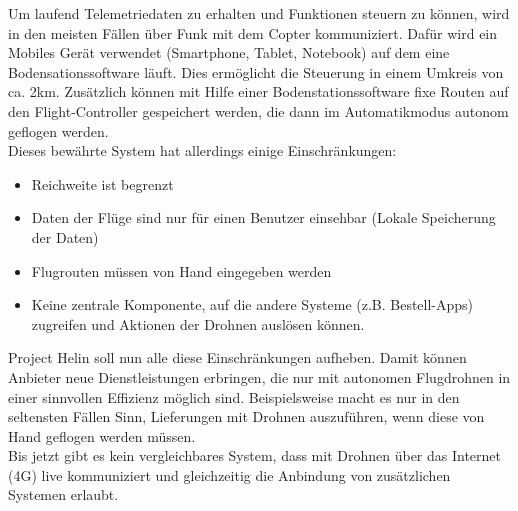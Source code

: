 Um laufend Telemetriedaten zu erhalten und Funktionen steuern zu können, wird in den meisten Fällen über Funk mit dem Copter kommuniziert. Dafür wird ein Mobiles Gerät verwendet (Smartphone, Tablet, Notebook) auf dem eine Bodensationssoftware läuft. Dies ermöglicht die Steuerung in einem Umkreis von ca. 2km. Zusätzlich können mit Hilfe einer Bodenstationssoftware fixe Routen auf den Flight-Controller gespeichert werden, die dann im Automatikmodus autonom geflogen werden.\\

Dieses bewährte System hat allerdings einige Einschränkungen: 

\begin{itemize}
	\item{Reichweite ist begrenzt}
	\item{Daten der Flüge sind nur für einen Benutzer einsehbar (Lokale Speicherung der Daten)}
	\item{Flugrouten müssen von Hand eingegeben werden}
	\item{Keine zentrale Komponente, auf die andere Systeme (z.B. Bestell-Apps) zugreifen und Aktionen der Drohnen auslösen können.}
\end{itemize}

Project Helin soll nun alle diese Einschränkungen aufheben. Damit können Anbieter neue Dienstleistungen erbringen, die nur mit autonomen Flugdrohnen in einer sinnvollen Effizienz möglich sind. Beispielsweise macht es nur in den seltensten Fällen Sinn, Lieferungen mit Drohnen auszuführen, wenn diese von Hand geflogen werden müssen. \\

Bis jetzt gibt es kein vergleichbares System, dass mit Drohnen über das Internet (4G) live kommuniziert und gleichzeitig die Anbindung von zusätzlichen Systemen erlaubt.

